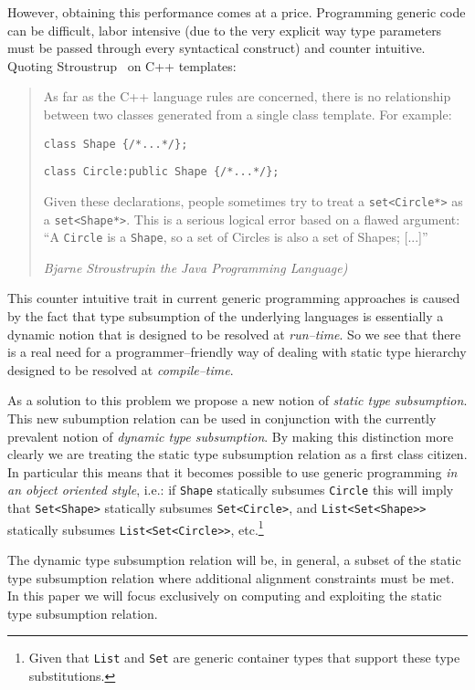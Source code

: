 \documentclass{sigplanconf}
\begin{document}
However, obtaining this performance comes at a price. Programming
generic code can be difficult, labor intensive (due to the very
explicit way type parameters must be passed through every syntactical
construct) and counter intuitive. Quoting
Stroustrup~\cite{Stroustrup2000} on C++ templates:
\begin{quote}
  As far as the C++ language rules are concerned, there is no
  relationship between two classes generated from a single class
  template. For example:

  \verb+class Shape {/*...*/};+
  
  \verb+class Circle:public Shape {/*...*/};+

  Given these declarations, people sometimes try to treat a
  \verb+set<Circle*>+ as a \verb+set<Shape*>+. This is a serious
  logical error based on a flawed argument: ``A \verb+Circle+ is a
  \verb+Shape+, so a set of Circles is also a set of Shapes; [...]''

  \emph{Bjarne Stroustrup\Generics in the Java Programming Language)}
\end{quote}

This counter intuitive trait in current generic programming approaches
is caused by the fact that type subsumption of the underlying
languages is essentially a dynamic notion that is designed to be
resolved at \emph{run--time}. So we see that there is a real need for
a programmer--friendly way of dealing with static type hierarchy
designed to be resolved at \emph{compile--time}.

As a solution to this problem we propose a new notion of \emph{static
  type subsumption}. This new subumption relation can be used in
conjunction with the currently prevalent notion of \emph{dynamic type
  subsumption}. By making this distinction more clearly we are
treating the static type subsumption relation as a first class
citizen. In particular this means that it becomes possible to use
generic programming \emph{in an object oriented style}, i.e.: if
\verb+Shape+ statically subsumes \verb+Circle+ this will imply that
\verb+Set<Shape>+ statically subsumes \verb+Set<Circle>+, and
\verb+List<Set<Shape>>+ statically subsumes \verb+List<Set<Circle>>+,
etc.\footnote{Given that {\tt List} and {\tt Set} are generic
  container types that support these type substitutions.}

The dynamic type subsumption relation will be, in general, a subset of
the static type subsumption relation where additional alignment
constraints must be met. In this paper we will focus exclusively on
computing and exploiting the static type subsumption relation.
\end{document}
